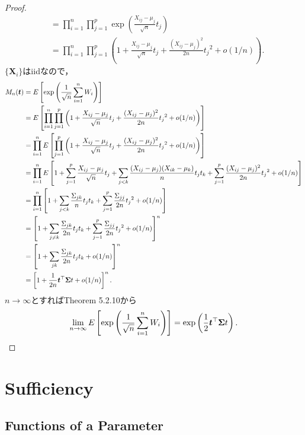 \begin{proof}
\begin{align*}
    &= \prod_{i=1}^n \prod_{j=1}^p \exp \left( \frac{X_{ij} - \mu_j}{\sqrt{n}} t_j \right) \\
    &= \prod_{i=1}^n \prod_{j=1}^p \left( 1 + \frac{X_{ij} - \mu_j}{\sqrt{n}} t_j
    + \frac{(X_{ij}-\mu_j)^2}{2n} t_j{}^2 + o(1/n) \right) .
  \end{align*}
  \(\{\boldsymbol{X}_i\}\)はiidなので，
  \begin{align*}
    M_n(\boldsymbol{t}) &= E \left[ \exp \left( \frac{1}{\sqrt{n}} \sum_{i=1}^n W_i \right) \right] \\
    &= E \left[ \prod_{i=1}^n \prod_{j=1}^p \left( 1 + \frac{X_{ij} - \mu_j}{\sqrt{n}} t_j
    + \frac{(X_{ij}-\mu_j)^2}{2n} t_j{}^2 + o(1/n) \right) \right] \\
    &= \prod_{i=1}^n E \left[ \prod_{j=1}^p \left( 1 + \frac{X_{ij} - \mu_j}{\sqrt{n}} t_j
    + \frac{(X_{ij}-\mu_j)^2}{2n} t_j{}^2 + o(1/n) \right) \right] \\
    &= \prod_{i=1}^n E \left[ 1 + \sum_{j=1}^p \frac{X_{ij} - \mu_j}{\sqrt{n}} t_j
    + \sum_{j<k} \frac{(X_{ij} - \mu_j)(X_{ik} - \mu_k)}{n} t_j t_k
    + \sum_{j=1}^p \frac{(X_{ij}-\mu_j)^2}{2n} t_j{}^2 + o(1/n) \right] \\
    &= \prod_{i=1}^n \left[ 1 + \sum_{j<k} \frac{\Sigma_{jk}}{n} t_j t_k
    + \sum_{j=1}^p \frac{\Sigma_{jj}}{2n} t_j{}^2 + o(1/n) \right] \\
    &= \left[ 1 + \sum_{j\neq k} \frac{\Sigma_{jk}}{2n} t_j t_k
    + \sum_{j=1}^p \frac{\Sigma_{jj}}{2n} t_j{}^2 + o(1/n) \right]^n \\
    &= \left[ 1 + \sum_{jk} \frac{\Sigma_{jk}}{2n} t_j t_k + o(1/n) \right]^n \\
    &= \left[ 1 + \frac{1}{2n} \boldsymbol{t}^\top {} \boldsymbol\Sigma \boldmath{t} + o(1/n) \right]^n .
  \end{align*}
  \(n\to\infty\)とすればTheorem 5.2.10から
  \[
  \lim_{n\to\infty} E \left[ \exp \left( \frac{1}{\sqrt{n}} \sum_{i=1}^n W_i \right) \right]
  = \exp \left( \frac{1}{2} \boldsymbol{t}^\top {} \boldsymbol\Sigma \boldmath{t} \right) .
  \]
\end{proof}

\setcounter{chapter}{6}
\chapter{Sufficiency}
\setcounter{section}{5}
\section{Functions of a Parameter}

